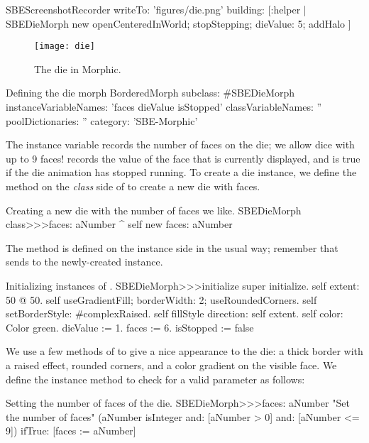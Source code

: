 \documentclass[a4paper,10pt,twoside]{book}
\begin{document}
\begin{ExecuteSmalltalkScript}
SBEScreenshotRecorder writeTo: 'figures/die.png' building: [:helper |
	SBEDieMorph new
		openCenteredInWorld;
		stopStepping;
		dieValue: 5;
		addHalo
]
\end{ExecuteSmalltalkScript}
\begin{figure}[ht]
	\centerline{\texttt{[image: die]}}
	\caption{The die in Morphic.
		\label{fig:dialogDie}}
\end{figure}


\begin{classdef}{Defining the die morph}
BorderedMorph subclass: #SBEDieMorph
	instanceVariableNames: 'faces dieValue isStopped'
	classVariableNames: ''
	poolDictionaries: ''
	category: 'SBE-Morphic'
\end{classdef}

The instance variable  records the number of faces on the die; we allow dice with up to 9 faces!
 records the value of the face that is currently displayed, and  is true if the die animation has stopped running.
To create a die instance, we define the  method on the \emph{class} side of  to create a new die with  faces.
\begin{method}{Creating a new die with the number of faces we like.}
SBEDieMorph class>>>faces: aNumber
	^ self new faces: aNumber
\end{method}

The  method is defined on the instance side in the usual way; remember that  sends  to the newly-created instance.
\begin{method}{Initializing instances of .}
SBEDieMorph>>>initialize
	super initialize.
	self extent: 50 @ 50.
	self useGradientFill; borderWidth: 2; useRoundedCorners.
	self setBorderStyle: #complexRaised.
	self fillStyle direction: self extent.
	self color: Color green.
	dieValue := 1.
	faces := 6.
	isStopped := false
\end{method}

We use a few methods of  to give a nice appearance to the die: a thick border with a raised effect, rounded corners, and a color gradient on the visible face.
We define the instance method  to check for a valid parameter as follows:
\begin{method}{Setting the number of faces of the die.}
SBEDieMorph>>>faces: aNumber
	"Set the number of faces"
	(aNumber isInteger
			and: [aNumber > 0]
			and: [aNumber <= 9])
		ifTrue: [faces := aNumber]
\end{method}
\end{document}

